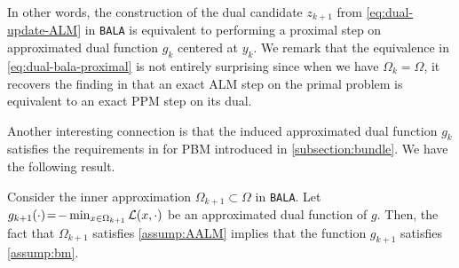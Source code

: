 \documentclass[11pt]{article}
\newcommand{\alg}{\texttt{BALA}}%
\begin{document}
In other words, the construction of the dual candidate $z_{k+1}$ from \cref{eq:dual-update-ALM} in \alg{} is equivalent to performing a proximal step on approximated dual function $g_{k}$ centered at $y_k$. We remark that the equivalence in \cref{eq:dual-bala-proximal} is not entirely surprising since when we have $\Omega_k = \Omega$, it recovers the finding in \cite{rockafellar1976augmented} that an exact ALM step on the primal problem is equivalent to an exact PPM step on its dual. 


Another interesting connection is that the induced approximated dual function $g_{k}$ satisfies the requirements in  for PBM introduced in \cref{subsection:bundle}. We have the following result. 
\begin{theorem}
    \label{prop:AALM-PBM}
    Consider the inner approximation $\Omega_{k+1} \subset \Omega$ in \alg. Let $g_{k+1}(\cdot)\!= \!- \min_{x \in \Omega_{k+1}} \mathcal{L}(x,\cdot)$ be an approximated dual function of $g$. Then, the fact that $\Omega_{k+1}$ satisfies \cref{assump:AALM} implies that the function $g_{k+1}$ satisfies \cref{assump:bm}.
\end{theorem}
\end{document}
